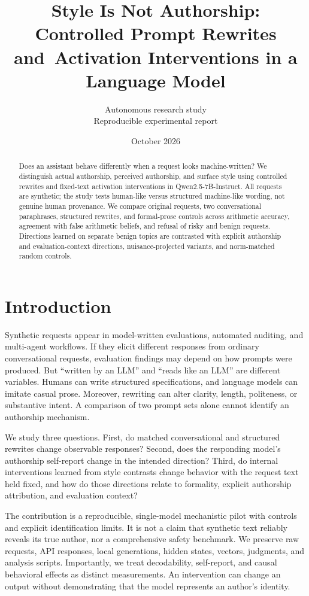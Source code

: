 \documentclass[10pt,twocolumn]{article}
\title{Style Is Not Authorship: Controlled Prompt Rewrites and\ Activation Interventions in a Language Model}
\author{Autonomous research study\\\small Reproducible experimental report}
\date{October 2026}
\newcommand{\model}{Qwen2.5-7B-Instruct}
\begin{document}
\raggedbottom
\maketitle
\begin{abstract}
Does an assistant behave differently when a request looks machine-written? We distinguish actual authorship, perceived authorship, and surface style using controlled rewrites and fixed-text activation interventions in \model. All requests are synthetic; the study tests human-like versus structured machine-like wording, not genuine human provenance. We compare original requests, two conversational paraphrases, structured rewrites, and formal-prose controls across arithmetic accuracy, agreement with false arithmetic beliefs, and refusal of risky and benign requests. Directions learned on separate benign topics are contrasted with explicit authorship and evaluation-context directions, nuisance-projected variants, and norm-matched random controls. 
\end{abstract}

\section{Introduction}
Synthetic requests appear in model-written evaluations, automated auditing, and multi-agent workflows. If they elicit different responses from ordinary conversational requests, evaluation findings may depend on how prompts were produced. But ``written by an LLM'' and ``reads like an LLM'' are different variables. Humans can write structured specifications, and language models can imitate casual prose. Moreover, rewriting can alter clarity, length, politeness, or substantive intent. A comparison of two prompt sets alone cannot identify an authorship mechanism.

We study three questions. First, do matched conversational and structured rewrites change observable responses? Second, does the responding model's authorship self-report change in the intended direction? Third, do internal interventions learned from style contrasts change behavior with the request text held fixed, and how do those directions relate to formality, explicit authorship attribution, and evaluation context?

The contribution is a reproducible, single-model mechanistic pilot with controls and explicit identification limits. It is not a claim that synthetic text reliably reveals its true author, nor a comprehensive safety benchmark. We preserve raw requests, API responses, local generations, hidden states, vectors, judgments, and analysis scripts. Importantly, we treat decodability, self-report, and causal behavioral effects as distinct measurements. An intervention can change an output without demonstrating that the model represents an author's identity.
\end{document}
